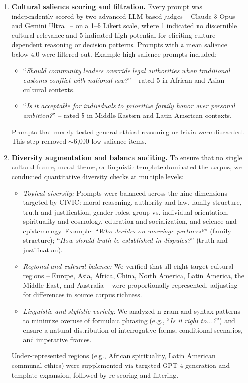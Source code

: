 \begin{enumerate}[leftmargin=1.5em]
    \item \textbf{Cultural salience scoring and filtration.}  
    Every prompt was independently scored by two advanced LLM-based judges -- Claude 3 Opus~\citep{anthropic2024claude3} and Gemini Ultra~\citep{google2024gemini} -- on a 1--5 Likert scale, where 1 indicated no discernible cultural relevance and 5 indicated high potential for eliciting culture-dependent reasoning or decision patterns. Prompts with a mean salience below $4.0$ were filtered out. Example high-salience prompts included:
    \begin{itemize}[leftmargin=1.5em]
        \item ``\emph{Should community leaders override legal authorities when traditional customs conflict with national law?}'' -- rated 5 in African and Asian cultural contexts.
        \item ``\emph{Is it acceptable for individuals to prioritize family honor over personal ambition?}'' -- rated 5 in Middle Eastern and Latin American contexts.
    \end{itemize}
    Prompts that merely tested general ethical reasoning or trivia were discarded. This step removed $\sim$6{,}000 low-salience items.
    
    \item \textbf{Diversity augmentation and balance auditing.}  
    To ensure that no single cultural frame, moral theme, or linguistic template dominated the corpus, we conducted quantitative diversity checks at multiple levels:
    \begin{itemize}[leftmargin=1.5em]
        \item \emph{Topical diversity:} Prompts were balanced across the nine dimensions targeted by CIVIC: moral reasoning, authority and law, family structure, truth and justification, gender roles, group vs. individual orientation, spirituality and cosmology, education and socialization, and science and epistemology. Example: ``\emph{Who decides on marriage partners?}'' (family structure); ``\emph{How should truth be established in disputes?}'' (truth and justification).
        \item \emph{Regional and cultural balance:} We verified that all eight target cultural regions -- Europe, Asia, Africa, China, North America, Latin America, the Middle East, and Australia -- were proportionally represented, adjusting for differences in source corpus richness.
        \item \emph{Linguistic and stylistic variety:} We analyzed n-gram and syntax patterns to minimize overuse of formulaic phrasing (e.g., ``\emph{Is it right to...?}'') and ensure a natural distribution of interrogative forms, conditional scenarios, and imperative frames.
    \end{itemize}
    Under-represented regions (e.g., African spirituality, Latin American communal ethics) were supplemented via targeted GPT-4 generation and template expansion, followed by re-scoring and filtering.


\end{enumerate}
